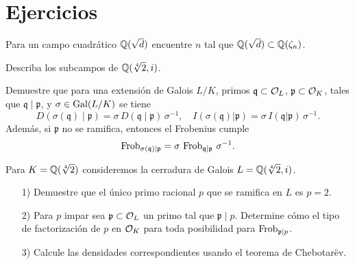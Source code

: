 \section*{Ejercicios}

\begin{ejercicio}
  Para un campo cuadrático $\mathbb{Q} (\sqrt{d})$ encuentre $n$ tal que
  $\mathbb{Q} (\sqrt{d}) \subset \mathbb{Q} (\zeta_n)$.
\end{ejercicio}

\begin{ejercicio}
  Describa los subcampos de $\mathbb{Q} (\sqrt[4]{2},i)$.
\end{ejercicio}

\begin{ejercicio}
  Demuestre que para una extensión de Galois $L/K$, primos
  $\mathfrak{q} \subset \mathcal{O}_L$, $\mathfrak{p} \subset \mathcal{O}_K$,
  tales que
  $\mathfrak{q} \mid \mathfrak{p}$, y $\sigma \in \operatorname{Gal} (L/K)$ se tiene
  \[ D (\sigma (\mathfrak{q}) \mid \mathfrak{p}) =
  \sigma \, D (\mathfrak{q} \mid \mathfrak{p}) \, \sigma^{-1}, \quad
  I (\sigma (\mathfrak{q})|\mathfrak{p}) =
  \sigma \, I (\mathfrak{q}|\mathfrak{p}) \, \sigma^{-1}. \]
  Además, si $\mathfrak{p}$ no se ramifica, entonces el Frobenius cumple
  \[ \operatorname{Frob}_{\sigma (\mathfrak{q})|\mathfrak{p}} =
  \sigma \, \operatorname{Frob}_{\mathfrak{q}|\mathfrak{p}} \, \sigma^{-1}. \]
\end{ejercicio}

\begin{ejercicio}
  Para $K = \mathbb{Q} (\sqrt[4]{2})$ consideremos la cerradura de Galois
  $L = \mathbb{Q} (\sqrt[4]{2},i)$.

  \begin{enumerate}
  \item[1)] Demuestre que el único primo racional $p$ que se ramifica en $L$ es
    $p = 2$.

  \item[2)] Para $p$ impar sea $\mathfrak{p} \subset \mathcal{O}_L$ un primo tal que
    $\mathfrak{p} \mid p$. Determine cómo el tipo de factorización de $p$ en
    $\mathcal{O}_K$ para toda posibilidad para $\operatorname{Frob}_{\mathfrak{p}|p}$.

  \item[3)] Calcule las densidades correspondientes usando el teorema
    de Chebotarëv.
  \end{enumerate}
\end{ejercicio}
